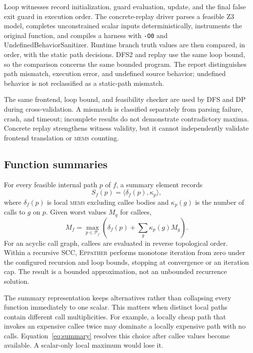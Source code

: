 \documentclass[10pt,conference]{IEEEtran}
\newcommand{\mems}{\textsc{mems}\xspace}
\newcommand{\tool}{\textsc{Eppather}\xspace}
\newcommand{\code}[1]{\texttt{#1}}
\begin{document}
Loop witnesses record initialization, guard evaluation, update, and the final false exit guard in execution order. The concrete-replay driver parses a feasible Z3 model, completes unconstrained scalar inputs deterministically, instruments the original function, and compiles a harness with \code{-O0} and UndefinedBehaviorSanitizer. Runtime branch truth values are then compared, in order, with the static path decisions. DFS2 and replay use the same loop bound, so the comparison concerns the same bounded program. The report distinguishes path mismatch, execution error, and undefined source behavior; undefined behavior is not reclassified as a static-path mismatch.

The same frontend, loop bound, and feasibility checker are used by DFS and DP during cross-validation. A mismatch is classified separately from parsing failure, crash, and timeout; incomplete results do not demonstrate contradictory maxima. Concrete replay strengthens witness validity, but it cannot independently validate frontend translation or \mems counting.

\subsection{Function summaries}
For every feasible internal path $p$ of $f$, a summary element records
\begin{equation}
S_f(p)=\langle \delta_f(p),\kappa_p\rangle,
\end{equation}
where $\delta_f(p)$ is local \mems excluding callee bodies and $\kappa_p(g)$ is the number of calls to $g$ on $p$. Given worst values $M_g$ for callees,
\begin{equation}
M_f=\max_{p\in\mathcal{P}_f}\left(\delta_f(p)+\sum_g\kappa_p(g)M_g\right).
\label{eq:summary}
\end{equation}
For an acyclic call graph, callees are evaluated in reverse topological order. Within a recursive SCC, \tool performs monotone iteration from zero under the configured recursion and loop bounds, stopping at convergence or an iteration cap. The result is a bounded approximation, not an unbounded recurrence solution.

The summary representation keeps alternatives rather than collapsing every function immediately to one scalar. This matters when distinct local paths contain different call multiplicities. For example, a locally cheap path that invokes an expensive callee twice may dominate a locally expensive path with no calls. Equation~\ref{eq:summary} resolves this choice after callee values become available. A scalar-only local maximum would lose it.
\end{document}
